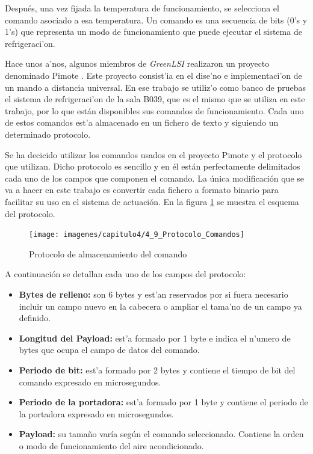 {	Después, una vez fijada la temperatura de funcionamiento, se selecciona el comando asociado a esa temperatura. Un comando es una secuencia de bits (0's y 1's) que representa un modo de funcionamiento que puede ejecutar el sistema de refrigeraci'on. 

	Hace unos a'nos, algunos miembros de \textit{GreenLSI} realizaron un proyecto denominado Pimote \cite{PIMOTE}. Este proyecto consist'ia en el dise'no e implementaci'on de un mando a distancia universal. En ese trabajo se utiliz'o como banco de pruebas el sistema de refrigeraci'on de la sala B039, que es el mismo que se utiliza en este trabajo, por lo que están disponibles sus comandos de funcionamiento. Cada uno de estos comandos est'a almacenado en un fichero de texto y siguiendo un determinado protocolo. 

	Se ha decicido utilizar los comandos usados en el proyecto Pimote y el protocolo que utilizan. Dicho protocolo es sencillo y en él están perfectamente delimitados cada uno de los campos que componen el comando. La única modificación que se va a hacer en este trabajo es convertir cada fichero a formato binario para facilitar su uso en el sistema de actuación.  En la figura \ref{4_9:protocolo_comando} se muestra el esquema del protocolo. 
\begin{figure}[h]
  \centering
  \texttt{[image: imagenes/capitulo4/4\_9\_Protocolo\_Comandos]}
   \caption{Protocolo de almacenamiento del comando}
   \label{4_9:protocolo_comando}
\end{figure}

\noindent A continuación se detallan cada uno de los campos del protocolo:

\begin{itemize}
     \item\textbf{Bytes de relleno:} son 6 bytes y est'an reservados por si fuera necesario incluir un campo nuevo en la cabecera o ampliar el tama'no de un campo ya definido.
     \item\textbf{Longitud del Payload:} est'a formado por 1 byte e indica el n'umero de bytes que ocupa el campo de datos del comando.
      \item\textbf{Periodo de bit:} est'a formado por 2 bytes y contiene el tiempo de bit del comando expresado en microsegundos.
      \item\textbf{Periodo de la portadora:} est'a formado por 1 byte y contiene el periodo de la portadora expresado en microsegundos. 
      \item\textbf{Payload:} su tamaño varía según el comando seleccionado. Contiene la orden o modo de funcionamiento del aire acondicionado.
\end{itemize}

}
